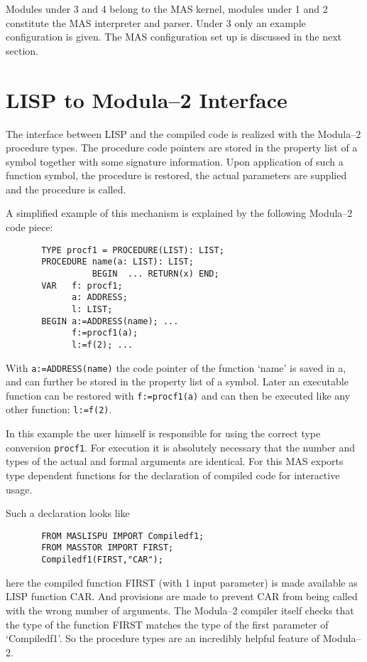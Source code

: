 Modules under 3 and 4 belong to the MAS kernel, 
modules under 1 and 2 constitute the MAS interpreter and parser.
Under 3 only an example configuration is given.
The MAS configuration
set up is discussed in the next section.


\section{LISP to Modula--2 Interface}

The interface between LISP and the compiled code 
is realized with
the Modula--2 procedure types. 
The procedure code pointers are stored in the property list
of a symbol together with some signature information. 
Upon application of such a function symbol, the procedure 
is restored, the actual parameters are supplied and the
procedure is called. 

A simplified example of this mechanism is explained by
the following Modula--2 code piece:   

\begin{verbatim}
       TYPE procf1 = PROCEDURE(LIST): LIST;
       PROCEDURE name(a: LIST): LIST; 
                 BEGIN  ... RETURN(x) END;
       VAR   f: procf1;
             a: ADDRESS;
             l: LIST;
       BEGIN a:=ADDRESS(name); ...
             f:=procf1(a);
             l:=f(2); ...
\end{verbatim}

With \verb/a:=ADDRESS(name)/ the code pointer of the 
function `name'
is saved in a, and can further be stored in the property 
list  of a symbol. 
Later an executable function can be restored with
\verb/f:=procf1(a)/ and can then be executed like any other 
function: \verb/l:=f(2)/.

In this example the user himself is responsible for
using the correct type conversion \verb/procf1/. 
For execution it is absolutely necessary that the number and 
types of 
the actual and formal arguments are identical.  
For this MAS exports type dependent functions for the 
declaration of compiled code 
for interactive usage.

Such a declaration looks like
\begin{verbatim}
       FROM MASLISPU IMPORT Compiledf1;
       FROM MASSTOR IMPORT FIRST; 
       Compiledf1(FIRST,"CAR");
\end{verbatim}
here the compiled function FIRST 
(with 1 input parameter)
is made available as LISP function CAR.
And provisions are made to prevent CAR from being
called with the wrong number of arguments.
The Modula--2 compiler itself checks that the type of the 
function FIRST matches the type of the first parameter
of `Compiledf1'.
So the procedure types are an incredibly 
helpful feature of Modula--2. 


